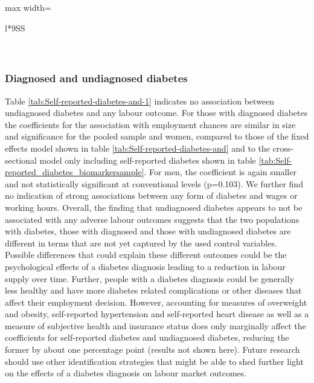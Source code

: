 \documentclass[12pt,english,british]{article}
\newcommand{\sym}[1]{\ensuremath{^{#1}}} %
\begin{document}
\begin{table}[h!]
\begin{adjustbox}{max width=\textwidth}
\begin{center}
{\begin{tabular}{l*{9}{SS}}
\\
\\
\multicolumn{10}{l}{\footnotesize \sym{*} \(p<0.10\), \sym{**} \(p<0.05\), \sym{***} \(p<0.01\)}\\
\end{tabular}%
}
\end{center}
\end{adjustbox}
\caption{\label{tab:Objective_diabetes}\textbf{Objectively measured diabetes and labour market outcomes}}
\end{table}  
  
  
  

\subsubsection*{Diagnosed and undiagnosed diabetes}

Table \ref{tab:Self-reported-diabetes-and-1}
indicates no association between undiagnosed
diabetes and any labour outcome. For those with diagnosed
diabetes the coefficients for the association with employment chances
are similar in size and significance for the pooled sample and women,
compared to those of the fixed effects model shown in table \ref{tab:Self-reported-diabetes-and} and to the cross-sectional model only including self-reported diabetes shown in table \ref{tab:Self-reported_diabetes_biomarkersample}.
For men, the coefficient is again smaller and not statistically significant
at conventional levels (p=0.103). We further find no indication of strong associations
between any form of diabetes and wages or working hours. 
Overall, the finding that undiagnosed diabetes appears to not be associated with any adverse labour outcomes suggests that the two populations with diabetes, those with diagnosed and those with undiagnosed diabetes are different in terms that are not yet captured by the used control variables. Possible differences that could explain these different outcomes could be the psychological effects of a diabetes diagnosis leading to a reduction in labour supply over time. Further, people with a diabetes diagnosis could be generally less healthy and have more diabetes related complications or other diseases that affect their employment decision. However, accounting for measures of overweight and obesity, self-reported hypertension and self-reported heart disease as well as a measure of subjective health and insurance status does only marginally affect the coefficients for self-reported diabetes and undiagnosed diabetes, reducing the former by about one percentage point (results not shown here). Future research should use other identification strategies that might be able to shed further light on the effects of a diabetes diagnosis on labour market outcomes.
\end{document}
